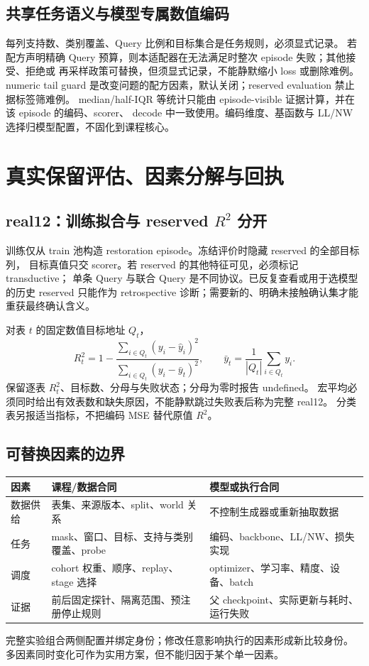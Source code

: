 \documentclass[10pt,UTF8,fontset=fandol]{ctexart}
\begin{document}
\subsection{共享任务语义与模型专属数值编码}
每列支持数、类别覆盖、Query 比例和目标集合是任务规则，必须显式记录。
若配方声明精确 Query 预算，则本适配器在无法满足时整次 episode 失败；其他接受、拒绝或
再采样政策可替换，但须显式记录，不能静默缩小 loss 或删除难例。
numeric tail guard 是改变问题的配方因素，默认关闭；reserved evaluation 禁止据标签筛难例。
median/half-IQR 等统计只能由 episode-visible 证据计算，并在该 episode 的编码、scorer、
decode 中一致使用。编码维度、基函数与 LL/NW 选择归模型配置，不固化到课程核心。

\newpage
\section{真实保留评估、因素分解与回执}
\subsection{real12：训练拟合与 reserved \texorpdfstring{$R^2$}{R2} 分开}
训练仅从 train 池构造 restoration episode。冻结评价时隐藏 reserved 的全部目标列，
目标真值只交 scorer。若 reserved 的其他特征可见，必须标记 transductive；
单条 Query 与联合 Query 是不同协议。已反复查看或用于选模型的历史 reserved 只能作为
retrospective 诊断；需要新的、明确未接触确认集才能重获最终确认含义。

对表 $t$ 的固定数值目标地址 $Q_t$，
\[
R_t^2=1-\frac{\sum_{i\in Q_t}(y_i-\hat y_i)^2}
{\sum_{i\in Q_t}(y_i-\bar y_t)^2},
\qquad \bar y_t=\frac{1}{|Q_t|}\sum_{i\in Q_t}y_i.
\]
保留逐表 $R_t^2$、目标数、分母与失败状态；分母为零时报告 undefined。
宏平均必须同时给出有效表数和缺失原因，不能静默跳过失败表后称为完整 real12。
分类表另报适当指标，不把编码 MSE 替代原值 $R^2$。

\subsection{可替换因素的边界}
\begin{center}\small
\begin{tabularx}{\linewidth}{@{}p{28mm}YY@{}}\toprule
因素 & 课程/数据合同 & 模型或执行合同 \\\midrule
数据供给 & 表集、来源版本、split、world 关系 & 不控制生成器或重新抽取数据 \\
任务 & mask、窗口、目标、支持与类别覆盖、probe & 编码、backbone、LL/NW、损失实现 \\
调度 & cohort 权重、顺序、replay、stage 选择 & optimizer、学习率、精度、设备、batch \\
证据 & 前后固定探针、隔离范围、预注册停止规则 & 父 checkpoint、实际更新与耗时、运行失败 \\\bottomrule
\end{tabularx}
\end{center}
完整实验组合两侧配置并绑定身份；修改任意影响执行的因素形成新比较身份。
多因素同时变化可作为实用方案，但不能归因于某个单一因素。
\end{document}
